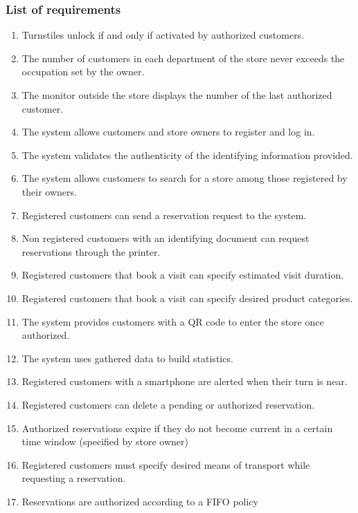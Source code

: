\subsubsection{List of requirements}
\begin{enumerate}[label=R\arabic*]
	\item Turnstiles unlock if and only if activated by authorized customers.
	\item The number of customers in each department of the store never exceeds the occupation set by the owner.
	\item The monitor outside the store displays the number of the last authorized customer.
	\item The system allows customers and store owners to register and log in.
	\item The system validates the authenticity of the identifying information provided.
	\item The system allows customers to search for a store among those registered by their owners.
	\item Registered customers can send a reservation request to the system.
	\item Non registered customers with an identifying document can request reservations through the printer.
	\item Registered customers that book a visit can specify estimated visit duration.
	\item Registered customers that book a visit can specify desired product categories.
	\item The system provides customers with a QR code to enter the store once authorized.
	\item The system uses gathered data to build statistics.
	\item Registered customers with a smartphone are alerted when their turn is near.

	\item Registered customers can delete a pending or authorized reservation.
	\item Authorized reservations expire if they do not become current in a certain time window (specified by store owner)
	\item Registered customers must specify desired means of transport while requesting a reservation.
	\item Reservations are authorized according to a FIFO policy
\end{enumerate}
